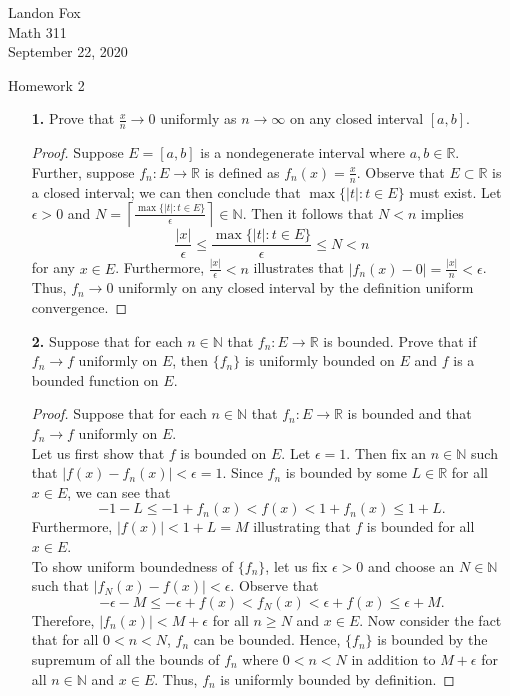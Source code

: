 \documentclass[ 12pt ]{article}
\begin{document}
\noindent Landon Fox \\
\noindent Math 311 \\
\noindent September 22, 2020

\begin{center}
	\Large Homework 2
\end{center}

\begin{enumerate}
	\item[\textbf{1.}] Prove that $\frac{x}{n} \to 0$ uniformly as $n \to \infty$ on any closed interval $[a, b]$.

		\begin{proof}
			Suppose $E = [a, b]$ is a nondegenerate interval where $a, b \in \mathbb{R}$. Further, suppose $f_n : E \to \mathbb{R}$ is defined as $f_n(x) = \frac{x}{n}$. Observe that
			$E \subset \mathbb{R}$ is a closed interval; we can then conclude that $\max \{ |t| : t \in E \}$ must exist. Let $\epsilon > 0$ and $N = \left \lceil \frac{\max \{ |t| : t
			\in E \}}{\epsilon} \right \rceil \in \mathbb{N}$. Then it follows that $N < n$ implies $$\frac{|x|}{\epsilon} \leq \frac{\max \{ |t| : t \in E \}}{\epsilon} \leq N < n$$
			for any $x \in E$. Furthermore, $\frac{|x|}{\epsilon} < n$ illustrates that $|f_n(x) - 0| = \frac{|x|}{n} < \epsilon$. Thus, $f_n \to 0$ uniformly on any closed interval by
			the definition uniform convergence.
		\end{proof}


	\item[\textbf{2.}] Suppose that for each $n \in \mathbb{N}$ that $f_n : E \to \mathbb{R}$ is bounded. Prove that if $f_n \to f$ uniformly on $E$, then $\{f_n\}$ is uniformly bounded
		on $E$ and $f$ is a bounded function on $E$.

		\begin{proof}
			Suppose that for each $n \in \mathbb{N}$ that $f_n : E \to \mathbb{R}$ is bounded and that $f_n \to f$ uniformly on $E$. \\

			Let us first show that $f$ is bounded on $E$. Let $\epsilon = 1$. Then fix an $n \in \mathbb{N}$ such that $|f(x) - f_n(x)| < \epsilon = 1$. Since $f_n$ is bounded by
			some $L \in \mathbb{R}$ for all $x \in E$, we can see that $$-1-L \leq -1 + f_n(x) < f(x) < 1 + f_n(x) \leq 1 + L.$$ Furthermore, $|f(x)| < 1 + L = M$ illustrating that
			$f$ is bounded for all $x \in E$. \\

			To show uniform boundedness of $\{ f_n \}$, let us fix $\epsilon > 0$ and choose an $N \in \mathbb{N}$ such that $|f_N(x) - f(x)| < \epsilon$. Observe that
			$$-\epsilon - M \leq -\epsilon + f(x) < f_N(x) < \epsilon + f(x) \leq \epsilon + M.$$ Therefore, $|f_n(x)| < M + \epsilon$ for all $n \geq N$ and $x \in E$. Now consider
			the fact that for all $0 < n < N$, $f_n$ can be bounded. Hence, $\{ f_n \}$ is bounded by the supremum of all the bounds of $f_n$ where $0 < n < N$ in addition to $M +
			\epsilon$ for all $n \in \mathbb{N}$ and $x \in E$. Thus, $f_n$ is uniformly bounded by definition.
		\end{proof}



\end{enumerate}
\end{document}

